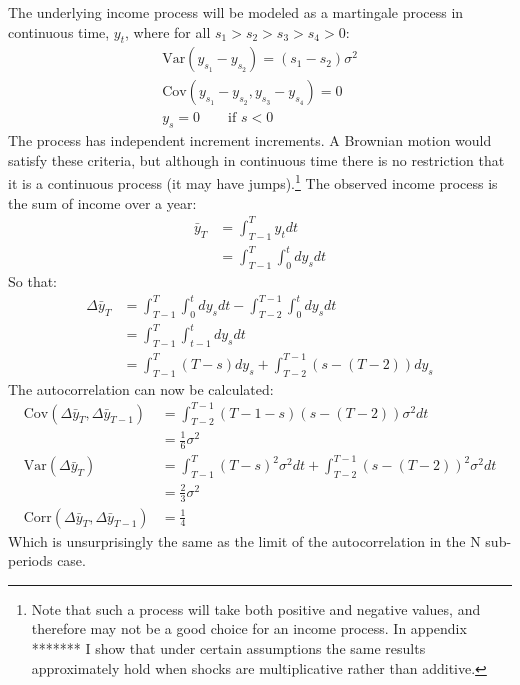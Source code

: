 \documentclass[titlepage]{\econtex}\newcommand{\texname}{BPP_TimeAgg}
\begin{document}
The underlying income process will be modeled as a martingale process in continuous time, $y_t$, where for all  $s_1>s_2>s_3>s_4>0$:
\begin{align*}
\mathrm{Var}(y_{s_1}-y_{s_2})=(s_1-s_2)\sigma^2 \\
\mathrm{Cov}(y_{s_1}-y_{s_2},y_{s_3}-y_{s_4}) = 0 \\
y_s = 0 \qquad \text{if } s<0
\end{align*}
The process has independent increment increments. A Brownian motion would satisfy these criteria, but although in continuous time there is no restriction that it is a continuous process (it may have jumps).\footnote{Note that such a process will take both positive and negative values, and therefore may not be a good choice for an income process. In appendix ******* I show that under certain assumptions the same results approximately hold when shocks are multiplicative rather than additive.} The observed income process is the sum of income over a year:
\begin{align*}
\bar{y}_T &= \int_{T-1}^{T} y_t dt \\
&= \int_{T-1}^{T} \int_{0}^{t} dy_s dt 
\end{align*}
So that:
\begin{align*}
\Delta \bar{y}_T &= \int_{T-1}^{T} \int_{0}^{t} dy_s dt - \int_{T-2}^{T-1} \int_{0}^{t} dy_s dt \\
&= \int_{T-1}^{T} \int_{t-1}^{t} dy_s dt \\
&= \int_{T-1}^{T} (T-s) dy_s + \int_{T-2}^{T-1} (s-(T-2)) dy_s 
\end{align*}
The autocorrelation can now be calculated:
\begin{align*}
\mathrm{Cov}(\Delta \bar{y}_T,\Delta \bar{y}_{T-1}) &=  \int_{T-2}^{T-1} (T-1-s)(s-(T-2)) \sigma^2 dt \\
&= \frac{1}{6}\sigma^2 \\
\mathrm{Var}(\Delta \bar{y}_T) &= \int_{T-1}^{T} (T-s)^2 \sigma^2 dt + \int_{T-2}^{T-1} (s-(T-2))^2 \sigma^2 dt \\
&= \frac{2}{3}\sigma^2 \\
\mathrm{Corr}(\Delta \bar{y}_T,\Delta \bar{y}_{T-1}) &= \frac{1}{4}
\end{align*}
Which is unsurprisingly the same as the limit of the autocorrelation in the N sub-periods case.
\end{document}
